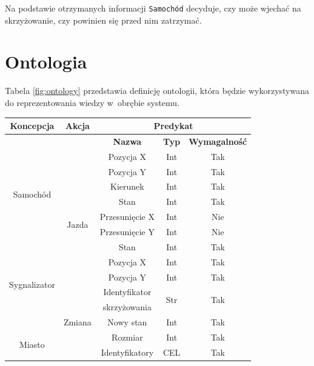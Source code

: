 \documentclass[11pt,a4paper]{article}
\begin{document}
Na podstawie otrzymanych informacji \verb+Samochód+ decyduje, czy może wjechać na skrzyżowanie, czy powinien się przed nim zatrzymać.

\section{Ontologia}

Tabela \ref{fig:ontology} przedstawia definicję ontologii, która będzie wykorzystywana do reprezentowania wiedzy w~obrębie systemu.

\begin{table}[ht]
    \centering
        \begin{tabular}{|c|c|c|c|c|}
            \hline
            \textbf{Koncepcja} & \textbf{Akcja} & \multicolumn{3}{c|}{\textbf{Predykat}} \\
            \hline
            & & \textbf{Nazwa} & \textbf{Typ} & \textbf{Wymagalność} \\
            \hline
            \multirow{6}{*}{Samochód} & & Pozycja X & Int & Tak \\
            \cline{3-5}
             & & Pozycja Y & Int & Tak \\
            \cline{3-5}
             & & Kierunek & Int & Tak \\
            \cline{3-5}
             & & Stan & Int & Tak \\
            \cline{2-5}
             & \multirow{2}{*}{Jazda} & Przesunięcie X & Int & Nie \\
            \cline{3-5}
             & & Przesunięcie Y & Int & Nie \\
            \hline
            \multirow{6}{*}{Sygnalizator} & & Stan & Int & Tak \\
            \cline{3-5}
             & & Pozycja X & Int & Tak \\
            \cline{3-5}
             & & Pozycja Y & Int & Tak \\
            \cline{3-5}
             & & Identyfikator & \multirow{2}{*}{Str} & \multirow{2}{*}{Tak} \\
             & & skrzyżowania & & \\
            \cline{2-5}
             & Zmiana & Nowy stan & Int & Tak \\
            \hline
            \multirow{3}{*}{Miasto} & & Rozmiar & Int & Tak \\
            \cline{3-5}
            & & Identyfikatory & \multirow{2}{*}{CEL} & \multirow{2}{*}{Tak} \\

\end{tabular}
\end{table}
\end{document}
